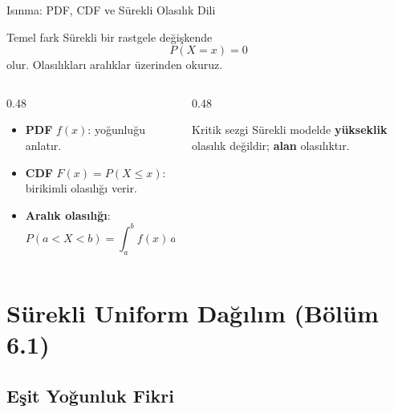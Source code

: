 \documentclass[light]{lutbeamer}
\begin{document}
\begin{frame}{Isınma: PDF, CDF ve Sürekli Olasılık Dili}
    \small
    \begin{block}{Temel fark}
        Sürekli bir rastgele değişkende
        \[
        P(X=x)=0
        \]
        olur. Olasılıkları aralıklar üzerinden okuruz.
    \end{block}

    \begin{columns}[T]
        \begin{column}{0.48\textwidth}
            \begin{itemize}
                \item \textbf{PDF} \(f(x)\): yoğunluğu anlatır.
                \item \textbf{CDF} \(F(x)=P(X\le x)\): birikimli olasılığı verir.
                \item \textbf{Aralık olasılığı}:
                \[
                P(a<X<b)=\int_a^b f(x)\,dx.
                \]
            \end{itemize}
        \end{column}
        \begin{column}{0.48\textwidth}
            \begin{alertblock}{Kritik sezgi}
                Sürekli modelde \textbf{yükseklik} olasılık değildir;
                \textbf{alan} olasılıktır.
            \end{alertblock}
        \end{column}
    \end{columns}
\end{frame}

\section{Sürekli Uniform Dağılım (Bölüm 6.1)}
\subsection{Eşit Yoğunluk Fikri}
\end{document}
